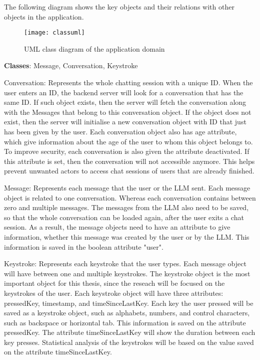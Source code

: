 The following diagram shows the key objects and their relations with other objects in the application.

\begin{figure}[h!]
    \centering
    \texttt{[image: classuml]}
    \caption{UML class diagram of the application domain}
\end{figure}

\textbf{Classes}: Message, Conversation, Keystroke

Conversation: Represents the whole chatting session with a unique ID.
When the user enters an ID, the backend server will look for a conversation that has the same ID.
If such object exists, then the server will fetch the conversation along with the Messages that belong to this conversation object.
If the object does not exist, then the server will initialise a new conversation object with ID that just has been given by the user.
Each conversation object also has age attribute, which give information about the age of the user to whom this object belongs to.
To improve security, each conversation is also given the attribute deactivated.
If this attribute is set, then the conversation will not accessible anymore.
This helps prevent unwanted actors to access chat sessions of users that are already finished.

Message: Represents each message that the user or the \ac{LLM} sent.
Each message object is related to one conversation.
Whereas each conversation contains between zero and multiple messages.
The messages from the \ac{LLM} also need to be saved, so that the whole conversation can be loaded again, after the user exits a chat session.
As a result, the message objects need to have an attribute to give information, whether this message was created by the user or by the \ac{LLM}.
This information is saved in the boolean attribute "user".

Keystroke: Represents each keystroke that the user types.
Each message object will have between one and multiple keystrokes.
The keystroke object is the most important object for this thesis, since the reseach will be focused on the keystrokes of the user.
Each keystroke object will have three attributes: pressedKey, timestamp, and timeSinceLastKey.
Each key the user pressed will be saved as a keystroke object, such as alphabets, numbers, and control characters, such as backspace or horizontal tab.
This information is saved on the attribute pressedKey.
The attribute timeSinceLastKey will show the duration between each key presses.
Statistical analysis of the keystrokes will be based on the value saved on the attribute timeSinceLastKey. 

